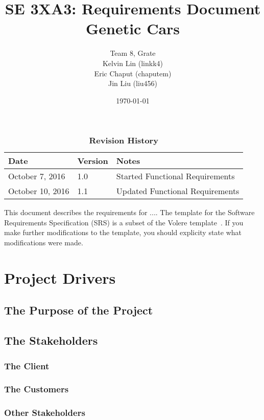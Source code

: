 \documentclass[12pt, titlepage]{article}
\title{SE 3XA3: Requirements Document\\Genetic Cars}
\author{Team 8, Grate
		\\ Kelvin Lin (linkk4)
		\\ Eric Chaput (chaputem)
		\\ Jin Liu (liu456)
}
\date{\today}
\begin{document}
\maketitle

\tableofcontents
\listoftables
\listoffigures

\begin{table}[bp]
\caption{\bf Revision History}
\begin{tabularx}{\textwidth}{p{3cm}p{2cm}X}
\toprule {\bf Date} & {\bf Version} & {\bf Notes}\\
\midrule
October 7, 2016 & 1.0 & Started Functional Requirements\\
October 10, 2016 & 1.1 & Updated Functional Requirements\\
\bottomrule
\end{tabularx}
\end{table}

\newpage


This document describes the requirements for ....  The template for the Software
Requirements Specification (SRS) is a subset of the Volere
template~\citep{RobertsonAndRobertson2012}.  If you make further modifications
to the template, you should explicity state what modifications were made.

\section{Project Drivers}

\subsection{The Purpose of the Project}

\subsection{The Stakeholders}

\subsubsection{The Client}

\subsubsection{The Customers}

\subsubsection{Other Stakeholders}
\end{document}
